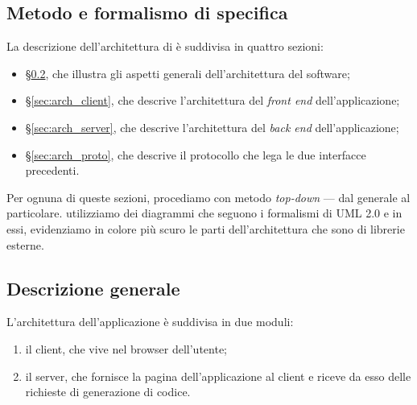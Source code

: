


\subsection{Metodo e formalismo di specifica}
La descrizione dell'architettura di \proj{} è suddivisa in quattro sezioni:
\begin{itemize}
	\item §\ref{sec:arch_gen}, che illustra gli aspetti generali dell'architettura del software;
	\item §\ref{sec:arch_client}, che descrive l'architettura del \emph{front end} dell'applicazione;
	\item §\ref{sec:arch_server}, che descrive l'architettura del \emph{back end} dell'applicazione;
	\item §\ref{sec:arch_proto}, che descrive il protocollo che lega le due interfacce precedenti.
\end{itemize}
Per ognuna di queste sezioni, procediamo con metodo \emph{top-down} --- dal generale al particolare. utilizziamo dei diagrammi che seguono i formalismi di UML 2.0 e in essi, evidenziamo in colore più scuro le parti dell'architettura che sono di librerie esterne.



\subsection{Descrizione generale} \label{sec:arch_gen}
L'architettura dell'applicazione è suddivisa in due moduli:
\begin{enumerate}
	\item il client, che vive nel browser dell'utente;
	\item il server, che fornisce la pagina dell'applicazione al client e riceve da esso delle richieste di generazione di codice.
\end{enumerate}

